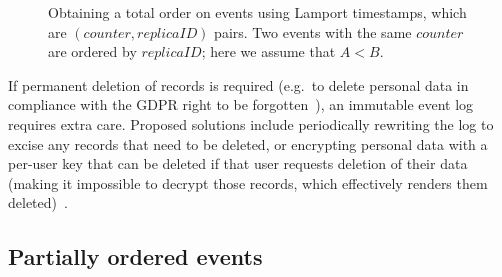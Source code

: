 \documentclass[sigconf]{acmart}
\begin{document}
\begin{figure}
  \caption{Obtaining a total order on events using Lamport timestamps, which are $(\mathit{counter}, \mathit{replicaID})$ pairs. Two events with the same $\mathit{counter}$ are ordered by $\mathit{replicaID}$; here we assume that $A<B$.}
  \label{fig:timestamp-order}
\end{figure}

If permanent deletion of records is required (e.g.\ to delete personal data in compliance with the GDPR right to be forgotten~\cite{Shastri:2020}), an immutable event log requires extra care.
Proposed solutions include periodically rewriting the log to excise any records that need to be deleted, or encrypting personal data with a per-user key that can be deleted if that user requests deletion of their data (making it impossible to decrypt those records, which effectively renders them deleted)~\cite{Stopford:2017}.

\subsection{Partially ordered events}\label{sec:partial-order}
\end{document}
